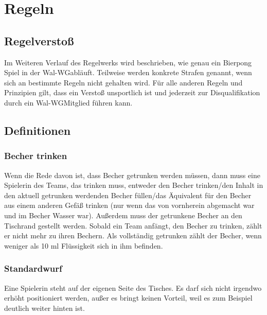 \documentclass[a5paper, 12pt]{book}
\begin{document}
\tableofcontents
\cleardoublepage
{}
\part {Regeln}\label{part:regeln}
\chapter*{Regelverstoß}\label{chap:regelverstoß}
Im Weiteren Verlauf des Regelwerks wird beschrieben, wie genau ein Bierpong Spiel in der Wal-WG\texttrademark abläuft. Teilweise werden konkrete Strafen genannt, wenn sich an bestimmte Regeln nicht gehalten wird. Für alle anderen Regeln und Prinzipien gilt, dass ein Verstoß unsportlich ist und jederzeit zur Disqualifikation durch ein Wal-WG\texttrademark Mitglied führen kann. 

\chapter{Definitionen} \label{chap:definitionen}
\section{Becher trinken} \label{sec:bechertrinken}
Wenn die Rede davon ist, dass Becher getrunken werden müssen, dann muss eine Spielerin des Teams, das trinken muss, entweder den Becher trinken/den Inhalt in den aktuell getrunken werdenden Becher füllen/das Äquivalent für den Becher aus einem anderen Gefäß trinken (nur wenn das von vornherein abgemacht war und im Becher Wasser war). Außerdem muss der getrunkene Becher an den Tischrand gestellt werden. Sobald ein Team anfängt, den Becher zu trinken, zählt er nicht mehr zu ihren Bechern. Als vollständig getrunken zählt der Becher, wenn weniger als 10 ml Flüssigkeit sich in ihm befinden.
\section{Standardwurf}\label{sec:standardwurf} 
Eine Spielerin steht auf der eigenen Seite des Tisches. Es darf sich nicht irgendwo erhöht positioniert werden, außer es bringt keinen Vorteil, weil es zum Beispiel deutlich weiter hinten ist. 
\end{document}
